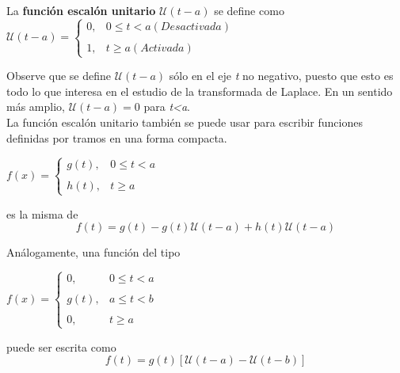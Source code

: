 \documentclass[12pt,a4paper]{article}
\begin{document}
La \textbf{función escalón unitario} $\mathcal{U}(t-a)$ se define como 
\\

$\mathcal{U}(t-a) =
\left\{ \begin{array}{lc}
             0, &   0 \leq t < a (Desactivada) \\
             \\1, &  t \geq a (Activada)
             \end{array}
\right.
$

\vspace{0.5cm}
Observe que se define $\mathcal{U}(t-a)$ sólo en el eje \textit{t} no negativo, puesto que esto es todo lo que interesa en el estudio de la transformada de Laplace. En un sentido más amplio, $\mathcal{U}(t-a) = 0$ para \textit{t<a}.
\\

La función escalón unitario también se puede usar para escribir funciones deﬁnidas por tramos en una forma compacta.

\vspace{0.5cm}
$f(x) =
\left\{ \begin{array}{lc}
             g(t), &   0 \leq t < a \\
             \\h(t), &  t \geq a
             \end{array}
\right.
$

\vspace{0.5cm}
es la misma de \begin{equation}
f(t)=g(t)-g(t)\mathcal{U}(t-a) + h(t)\mathcal{U}(t-a)
\end{equation}

\vspace{0.5cm}
Análogamente, una función del tipo

\vspace{0.5cm}

$f(x) =
\left\{ \begin{array}{lc}
             0, &   0 \leq t < a \\
             \\g(t), &  a \leq t < b \\
             \\0, & t \geq a
             \end{array}
\right.
$

\vspace{0.5cm}
puede ser escrita como \begin{equation}
f(t)=g(t)[\mathcal{U}(t-a)-\mathcal{U}(t-b)]
\end{equation}
\end{document}
